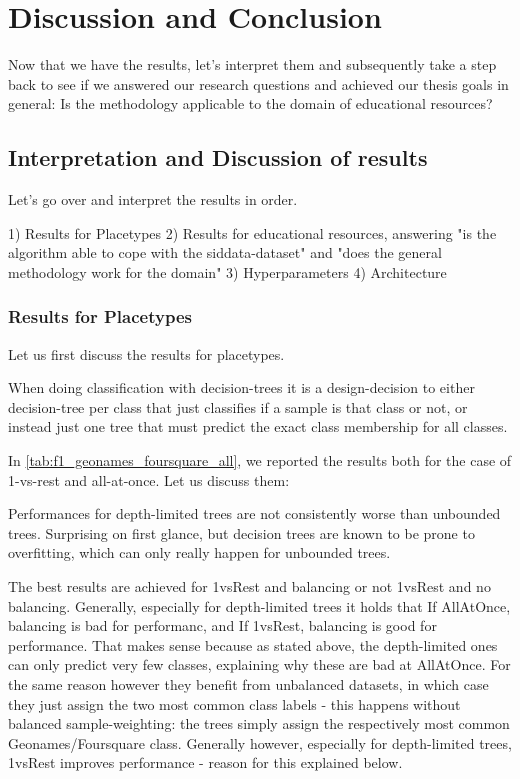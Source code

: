 \chapter{Discussion and Conclusion}

Now that we have the results, let's interpret them and subsequently take a step back to see if we answered our research questions and achieved our thesis goals in general: Is the methodology applicable to the domain of educational resources?

\section{Interpretation and Discussion of results}

Let's go over and interpret the results in order.

1) Results for Placetypes
2) Results for educational resources, answering "is the algorithm able to cope with the siddata-dataset" and "does the general methodology work for the domain"
3) Hyperparameters
4) Architecture 

\subsection{Results for Placetypes}

Let us first discuss the results for placetypes. 

When doing classification with decision-trees it is a design-decision to either decision-tree per class that just classifies if a sample is that class or not, or instead just one tree that must predict the exact class membership for all classes.

In \autoref{tab:f1_geonames_foursquare_all}, we reported the results both for the case of 1-vs-rest and all-at-once. Let us discuss them:

Performances for depth-limited trees are not consistently worse than unbounded trees. Surprising on first glance, but decision trees are known to be prone to overfitting, which can only really happen for unbounded trees.

The best results are achieved for 1vsRest and balancing or not 1vsRest and no balancing. Generally, especially for depth-limited trees it holds that If AllAtOnce, balancing is bad for performanc, and If 1vsRest, balancing is good for performance. That makes sense because as stated above, the depth-limited ones can only predict very few classes, explaining why these are bad at AllAtOnce. For the same reason however they benefit from unbalanced datasets, in which case they just assign the two most common class labels - this happens without balanced sample-weighting: the trees simply assign the respectively most common Geonames/Foursquare class. Generally however, especially for depth-limited trees, 1vsRest improves performance - reason for this explained below.


